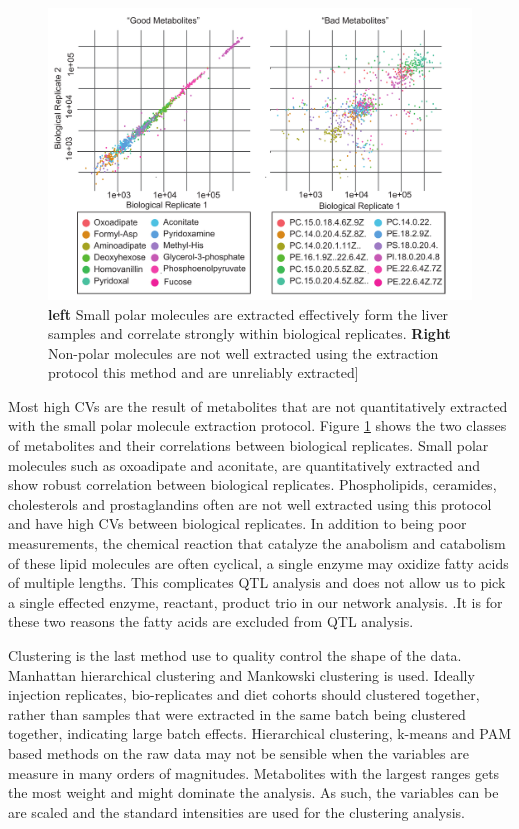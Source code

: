 \documentclass[a4paper]{book}
\begin{document}
	\begin{figure}[bh!t]
		\centering
		\includegraphics[width=\linewidth]{3.Metabolomics/Good_and_Bad_Metabolites.pdf}
		\caption{ \textbf{left} Small polar molecules are extracted effectively form the liver samples and correlate strongly within biological replicates. \textbf{Right} Non-polar molecules are not well extracted using the extraction protocol this method and are unreliably extracted] }
		\label{Fig:Good and Bad Metabs}
	\end{figure}
	
	Most high CVs are the result of metabolites that are not quantitatively extracted with the small polar molecule extraction protocol. Figure \ref{Fig:Good and Bad Metabs}  shows the two classes of metabolites and their correlations between biological replicates. Small polar molecules such as oxoadipate and aconitate, are quantitatively extracted and show robust correlation between biological replicates. Phospholipids, ceramides, cholesterols and prostaglandins often are not well extracted using this protocol and have high CVs between biological replicates. In addition to being poor measurements, the chemical reaction that catalyze the anabolism and catabolism of these lipid molecules are often cyclical, a single enzyme may oxidize fatty acids of multiple lengths. This complicates QTL analysis and does not allow us to pick a single effected enzyme, reactant, product trio in our network analysis. .It is for these two reasons the fatty acids are excluded from QTL analysis.
	
	Clustering is the last method use to quality control the shape of the data. Manhattan hierarchical clustering and Mankowski clustering is used. Ideally injection replicates, bio-replicates and diet cohorts should clustered together, rather than samples that were extracted in the same batch being clustered together, indicating large batch effects. Hierarchical clustering, k-means and PAM based methods on the raw data may not be sensible when the variables are measure in many orders of magnitudes. Metabolites with the largest ranges gets the most weight and might dominate the analysis. As such, the variables can be are scaled and the standard intensities are used for the clustering analysis.
	
\end{document}
